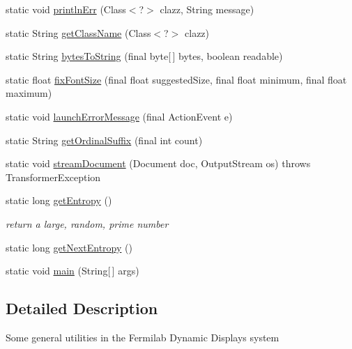 \begin{DoxyCompactItemize}
static void \hyperlink{classgov_1_1fnal_1_1ppd_1_1dd_1_1util_1_1nonguiUtils_1_1GeneralUtilities_a5c393ea898b3618065d21539c6f4bc0b}{println\-Err} (Class$<$?$>$ clazz, String message)
\item 
static String \hyperlink{classgov_1_1fnal_1_1ppd_1_1dd_1_1util_1_1nonguiUtils_1_1GeneralUtilities_a6a4a5c0040bbfab986ee94215f59ba11}{get\-Class\-Name} (Class$<$?$>$ clazz)
\item 
static String \hyperlink{classgov_1_1fnal_1_1ppd_1_1dd_1_1util_1_1nonguiUtils_1_1GeneralUtilities_a5b74a0cc0ff9fdc6681d07ecccc28af6}{bytes\-To\-String} (final byte\mbox{[}$\,$\mbox{]} bytes, boolean readable)
\item 
static float \hyperlink{classgov_1_1fnal_1_1ppd_1_1dd_1_1util_1_1nonguiUtils_1_1GeneralUtilities_a82609497462335ce2ea9ed61beec42b3}{fix\-Font\-Size} (final float suggested\-Size, final float minimum, final float maximum)
\item 
static void \hyperlink{classgov_1_1fnal_1_1ppd_1_1dd_1_1util_1_1nonguiUtils_1_1GeneralUtilities_a71e9cabd56310a2a9c4fe6c4063a0e7c}{launch\-Error\-Message} (final Action\-Event e)
\item 
static String \hyperlink{classgov_1_1fnal_1_1ppd_1_1dd_1_1util_1_1nonguiUtils_1_1GeneralUtilities_ae7d9951d63ab4a0d6bc07299db31c59e}{get\-Ordinal\-Suffix} (final int count)
\item 
static void \hyperlink{classgov_1_1fnal_1_1ppd_1_1dd_1_1util_1_1nonguiUtils_1_1GeneralUtilities_ab8d4b0f08c45693ef52e8bfbda54bcdd}{stream\-Document} (Document doc, Output\-Stream os)  throws Transformer\-Exception 
\item 
static long \hyperlink{classgov_1_1fnal_1_1ppd_1_1dd_1_1util_1_1nonguiUtils_1_1GeneralUtilities_ac53debfa3a7dacdf09e5d436881e476d}{get\-Entropy} ()
\begin{DoxyCompactList}\small\item\em return a large, random, prime number \end{DoxyCompactList}\item 
static long \hyperlink{classgov_1_1fnal_1_1ppd_1_1dd_1_1util_1_1nonguiUtils_1_1GeneralUtilities_a80182ddcdb1a64fe5ca1591cd714ba06}{get\-Next\-Entropy} ()
\item 
static void \hyperlink{classgov_1_1fnal_1_1ppd_1_1dd_1_1util_1_1nonguiUtils_1_1GeneralUtilities_ad103b308d286560066f0e07535c1416b}{main} (String\mbox{[}$\,$\mbox{]} args)
\end{DoxyCompactItemize}


\subsection{Detailed Description}
Some general utilities in the Fermilab Dynamic Displays system

